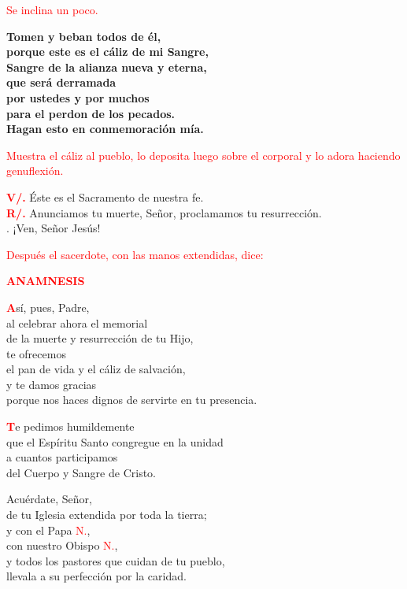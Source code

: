 \documentclass[12pt, letterpaper]{report}
\begin{document}
  \large{\textcolor{red}{Se inclina un poco.}}

  \LARGE{ \bfseries{ Tomen y beban todos de \'el,\\
  porque este es el c\'aliz de mi Sangre,\\
  Sangre de la alianza nueva y eterna,\\
  que ser\'a derramada\\
  por ustedes y por muchos\\
  para el perdon de los pecados.\\
  Hagan esto en conmemoraci\'on m\'ia.}}

  \large{\textcolor{red}{Muestra el c\'aliz al pueblo, lo deposita luego sobre el corporal y lo adora haciendo genuflexi\'on.}}

  \noindent
  \Large {\bfseries \textcolor{red}{V/.}} \hspace{0.5cm} \'Este es el Sacramento de nuestra fe.\\
  \Large {\bfseries \textcolor{red}{R/.}} \hspace{0.5cm} Anunciamos tu muerte, Se\~nor, proclamamos tu resurrecci\'on.\\
  .\hspace{1.7cm} ¡Ven, Se\~nor Jes\'us!

  \large{\textcolor{red}{Despu\'es el sacerdote, con las manos extendidas, dice:}}

  \Large {\bfseries \textcolor{red}{ANAMNESIS}}

  \Large \lettrine[lines=2]{\bfseries \textcolor{red}{A}}{}s\'i, pues, Padre,\\
  al celebrar ahora el memorial\\
  de la muerte y resurrecci\'on de tu Hijo,\\
  te ofrecemos\\
  el pan de vida y el c\'aliz de salvaci\'on,\\
  y te damos gracias\\
  porque nos haces dignos de servirte en tu presencia.

  \lettrine[lines=2]{\bfseries \textcolor{red}{T}}{}e pedimos humildemente\\
  que el Esp\'iritu Santo congregue en la unidad\\
  a cuantos participamos\\
  del Cuerpo y Sangre de Cristo.

  Acu\'erdate, Se\~nor,\\
  de tu Iglesia extendida por toda la tierra; \\
  y con el Papa \textcolor{red}{N.},\\
  con nuestro Obispo \textcolor{red}{N.},\\
  y todos los pastores que cuidan de tu pueblo,\\
  llevala a su perfecci\'on por la caridad.
\end{document}
